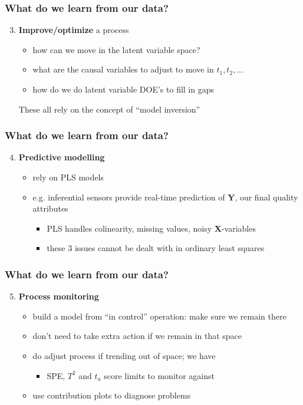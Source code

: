 \begin{frame}\frametitle{What do we learn from our data?}

\begin{enumerate}
	\setcounter{enumi}{2}
	\item {\bf \color{myGreen}Improve/optimize} a process
	\begin{itemize}
		\item 	how can we move in the latent variable space?
		\item 	what are the causal variables to adjust to move in \( t_1, t_2, \ldots \)
		\item 	how do we do latent variable DOE's to fill in gaps
	\end{itemize}	
	These all rely on the concept of \alert{``model inversion''}
\end{enumerate}
\end{frame}

\begin{frame}\frametitle{What do we learn from our data?}

\begin{enumerate}
	\setcounter{enumi}{3}
	\item {\bf \color{myGreen}Predictive modelling} 
	\begin{itemize}
		\item 	rely on PLS models
		\item 	e.g. inferential sensors provide real-time prediction of \( \mathbf{Y} \), our final quality attributes
		\begin{itemize}
			\item 	PLS handles colinearity, missing values, noisy \( \mathbf{X} \)-variables
			\item 	these 3 issues cannot be dealt with in ordinary least squares
		\end{itemize}
	\end{itemize}	
\end{enumerate}
\end{frame}

\begin{frame}\frametitle{What do we learn from our data?}

\begin{enumerate}
	\setcounter{enumi}{4}
	\item {\bf \color{myGreen}Process monitoring} 
	\begin{itemize}
		\item 	build a model from ``in control'' operation: make sure we remain there
		\item 	don't need to take extra action if we remain in that space
		\item 	do adjust process if trending out of space; we have
		\begin{itemize}
			\item 	SPE, \( T^2 \) and \( t_a \) score limits to monitor against
		\end{itemize}
		
		\item 	use contribution plots to diagnose problems
	\end{itemize}	
\end{enumerate}
\end{frame}

